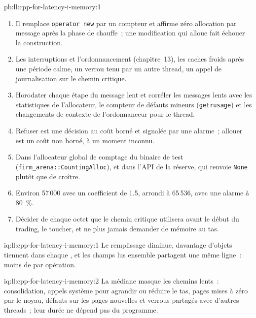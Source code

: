 \begin{solution}{pb:ll:cpp-for-latency-i-memory:1}
\begin{enumerate}
\qty{1.3}{\micro\second}, soit quarante fois une écriture dans une page déjà présente.
\item Il remplace \texttt{operator new} par un compteur et affirme zéro allocation par message après la phase de chauffe~; une modification
qui alloue fait échouer la construction.
\item Les interruptions et l'ordonnancement (chapitre~13), les caches froids après une période calme, un verrou tenu par un autre thread, un appel
de journalisation sur le chemin critique.
\item Horodater chaque étape du message lent et corréler les messages lents avec les statistiques de l'allocateur, le compteur de défauts mineurs
(\texttt{getrusage}) et les changements de contexte de l'ordonnanceur pour le thread.
\item Refuser est une décision au coût borné et signalée par une alarme~; allouer est un coût non borné, à un moment inconnu.
\item Dans l'allocateur global de comptage du binaire de test (\texttt{firm\_arena::CountingAlloc}), et dans l'API de la réserve, qui
renvoie \texttt{None} plutôt que de croître.
\item Environ 57\,000 avec un coefficient de 1.5, arrondi à 65\,536, avec une alarme à 80~\%.
\item Décider de chaque octet que le chemin critique utilisera avant le début du trading, le toucher, et ne plus jamais demander de mémoire au tas.
\end{enumerate}
\end{solution}

\begin{solution}{iq:ll:cpp-for-latency-i-memory:1}
Le remplissage diminue, davantage d'objets tiennent dans chaque , et les champs lus ensemble partagent une même ligne~: moins de  par opération.
\end{solution}

\begin{solution}{iq:ll:cpp-for-latency-i-memory:2}
La médiane masque les chemins lents~: consolidation, appels système pour agrandir ou réduire le tas, pages mises à zéro par le noyau, défauts
sur les pages nouvelles et verrous partagés avec d'autres threads~; leur durée ne dépend pas du programme.
\end{solution}

